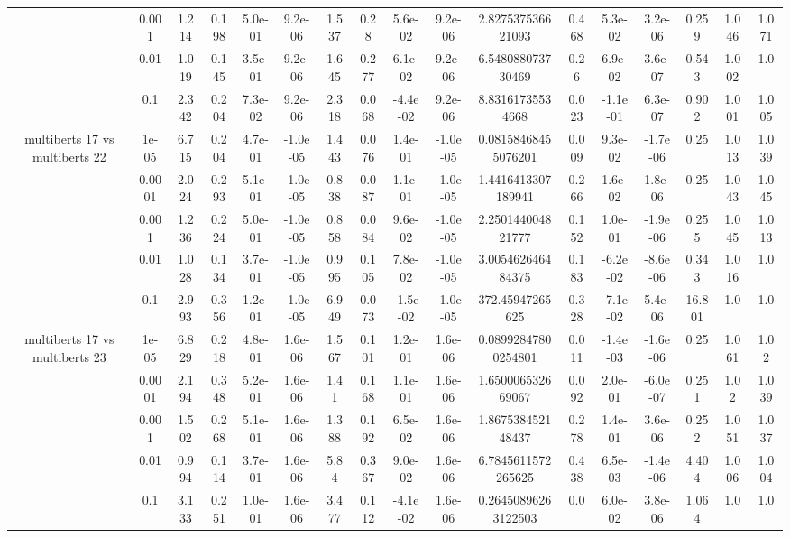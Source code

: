 \begin{tabular}{|c|c|c|c|c|c|c|c|c|c|c|c|c|c|c|c|c|}
 & 0.001 & 1.214 & 0.198 & 5.0e-01 & 9.2e-06 & 1.537 & 0.28 & 5.6e-02 & 9.2e-06 & 2.827537536621093 & 0.468 & 5.3e-02 & 3.2e-06 & 0.259 & 1.046 & 1.071 \\
 & 0.01 & 1.019 & 0.145 & 3.5e-01 & 9.2e-06 & 1.645 & 0.277 & 6.1e-02 & 9.2e-06 & 6.548088073730469 & 0.26 & 6.9e-02 & 3.6e-07 & 0.543 & 1.002 & 1.0 \\
 & 0.1 & 2.342 & 0.204 & 7.3e-02 & 9.2e-06 & 2.318 & 0.068 & -4.4e-02 & 9.2e-06 & 8.83161735534668 & 0.023 & -1.1e-01 & 6.3e-07 & 0.902 & 1.001 & 1.005 \\
\hline
\multirow{5}{*}{multiberts 17 vs multiberts 22} & 1e-05 & 6.715 & 0.204 & 4.7e-01 & -1.0e-05 & 1.443 & 0.076 & 1.4e-01 & -1.0e-05 & 0.08158468455076201 & 0.009 & 9.3e-02 & -1.7e-06 & 0.25 & 1.013 & 1.039 \\
 & 0.0001 & 2.024 & 0.293 & 5.1e-01 & -1.0e-05 & 0.838 & 0.087 & 1.1e-01 & -1.0e-05 & 1.4416413307189941 & 0.266 & 1.6e-02 & 1.8e-06 & 0.25 & 1.043 & 1.045 \\
 & 0.001 & 1.236 & 0.224 & 5.0e-01 & -1.0e-05 & 0.858 & 0.084 & 9.6e-02 & -1.0e-05 & 2.250144004821777 & 0.152 & 1.0e-01 & -1.9e-06 & 0.255 & 1.045 & 1.013 \\
 & 0.01 & 1.028 & 0.134 & 3.7e-01 & -1.0e-05 & 0.995 & 0.105 & 7.8e-02 & -1.0e-05 & 3.005462646484375 & 0.183 & -6.2e-02 & -8.6e-06 & 0.343 & 1.016 & 1.0 \\
 & 0.1 & 2.993 & 0.356 & 1.2e-01 & -1.0e-05 & 6.949 & 0.073 & -1.5e-02 & -1.0e-05 & 372.45947265625 & 0.328 & -7.1e-02 & 5.4e-06 & 16.801 & 1.0 & 1.0 \\
\hline
\multirow{5}{*}{multiberts 17 vs multiberts 23} & 1e-05 & 6.829 & 0.218 & 4.8e-01 & 1.6e-06 & 1.567 & 0.101 & 1.2e-01 & 1.6e-06 & 0.08992847800254801 & 0.011 & -1.4e-03 & -1.6e-06 & 0.25 & 1.061 & 1.02 \\
 & 0.0001 & 2.194 & 0.348 & 5.2e-01 & 1.6e-06 & 1.41 & 0.168 & 1.1e-01 & 1.6e-06 & 1.650006532669067 & 0.092 & 2.0e-01 & -6.0e-07 & 0.251 & 1.02 & 1.039 \\
 & 0.001 & 1.502 & 0.268 & 5.1e-01 & 1.6e-06 & 1.388 & 0.192 & 6.5e-02 & 1.6e-06 & 1.867538452148437 & 0.278 & 1.4e-01 & 3.6e-06 & 0.252 & 1.051 & 1.037 \\
 & 0.01 & 0.994 & 0.114 & 3.7e-01 & 1.6e-06 & 5.84 & 0.367 & 9.0e-02 & 1.6e-06 & 6.7845611572265625 & 0.438 & 6.5e-03 & -1.4e-06 & 4.404 & 1.006 & 1.004 \\
 & 0.1 & 3.133 & 0.251 & 1.0e-01 & 1.6e-06 & 3.477 & 0.112 & -4.1e-02 & 1.6e-06 & 0.26450896263122503 & 0.0 & 6.0e-02 & 3.8e-06 & 1.064 & 1.0 & 1.0 \\

\end{tabular}
